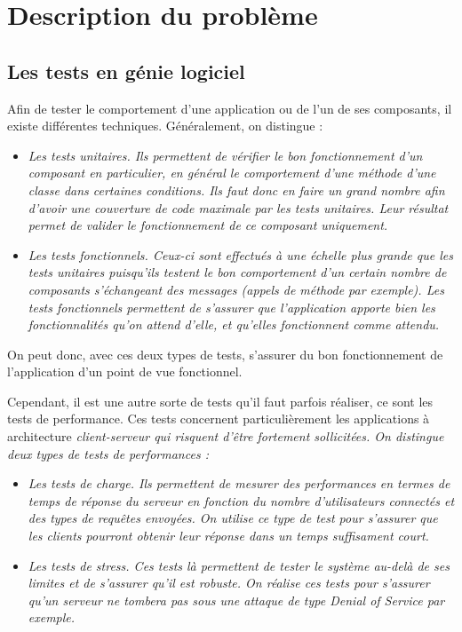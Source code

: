 \chapter{Description du problème}

\section{Les tests en génie logiciel}
Afin de tester le comportement d'une application ou de l'un de ses composants, il existe différentes techniques. Généralement, on distingue :
\begin{itemize}
  \item \em{Les tests unitaires}. Ils permettent de vérifier le bon fonctionnement d'un composant en particulier, en général le comportement d'une méthode d'une classe dans certaines conditions. Ils faut donc en faire un grand nombre afin d'avoir une couverture de code maximale par les tests unitaires. Leur résultat permet de valider le fonctionnement de ce composant uniquement.
  \item \em{Les tests fonctionnels}. Ceux-ci sont effectués à une échelle plus grande que les tests unitaires puisqu'ils testent le bon comportement d'un certain nombre de composants s'échangeant des messages (appels de méthode par exemple). Les tests fonctionnels permettent de s'assurer que l'application apporte bien les fonctionnalités qu'on attend d'elle, et qu'elles fonctionnent comme attendu.
\end{itemize}

On peut donc, avec ces deux types de tests, s'assurer du bon fonctionnement de l'application d'un point de vue fonctionnel.

Cependant, il est une autre sorte de tests qu'il faut parfois réaliser, ce sont les tests de performance. Ces tests concernent particulièrement les applications à architecture \em{client-serveur} qui risquent d'être fortement sollicitées. On distingue deux types de tests de performances : 
\begin{itemize}
  \item \em{Les tests de charge}. Ils permettent de mesurer des performances en termes de temps de réponse du serveur en fonction du nombre d'utilisateurs connectés et des types de requêtes envoyées. On utilise ce type de test pour s'assurer que les clients pourront obtenir leur réponse dans un temps suffisament court.
  \item \em{Les tests de stress}. Ces tests là permettent de tester le système au-delà de ses limites et de s'assurer qu'il est robuste. On réalise ces tests pour s'assurer qu'un serveur ne tombera pas sous une attaque de type \em{Denial of Service} par exemple.
\end{itemize}

